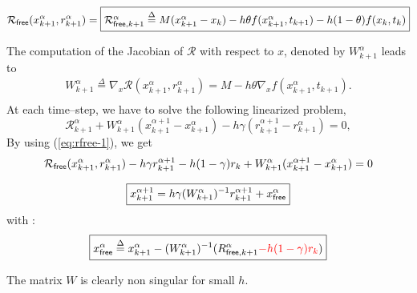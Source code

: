 \[  \mathcal R
_{{\sf free}}(x^{\alpha}_{k+1},r^{\alpha}_{k+1} )=\fbox{$ \mathcal R _{{\sf free}, k+1} ^{\alpha} \stackrel{\Delta}{=}  M(x^{\alpha}_{k+1} - x_{k}) -h\theta f( x^{\alpha}_{k+1} , t_{k+1}) - h(1-\theta)f(x_k,t_k)$}\]
 
The computation of the Jacobian of $\mathcal R$ with respect to $x$, denoted by $   W^{\alpha}_{k+1}$ leads to 
\begin{equation}
   \label{eq:NL9}
   \begin{array}{l}
    W^{\alpha}_{k+1} \stackrel{\Delta}{=} \nabla_{x} \mathcal R (x^{\alpha}_{k+1},r^{\alpha}_{k+1})= M - h  \theta \nabla_{x} f(  x^{\alpha}_{k+1}, t_{k+1} ).\\
 \end{array}
\end{equation}
At each time--step, we have to solve the following linearized problem,
\begin{equation}
   \label{eq:NL10}
    \mathcal R^{\alpha}_{k+1} + W^{\alpha}_{k+1} (x^{\alpha+1}_{k+1} -
    x^{\alpha}_{k+1}) - h \gamma (r^{\alpha+1}_{k+1} - r^{\alpha}_{k+1} )  =0 ,
\end{equation}
By using (\ref{eq:rfree-1}), we get
\begin{equation}
  \label{eq:rfree-2}
  \mathcal R
_{{\sf free}}(x^{\alpha}_{k+1},r^{\alpha}_{k+1} )  - h\gamma r^{\alpha+1}_{k+1} - h(1-\gamma)r_k  + W^{\alpha}_{k+1} (x^{\alpha+1}_{k+1} -
    x^{\alpha}_{k+1})  =0 
\end{equation}

{
  \begin{equation}
    \label{eq:rfree-11}
    \boxed{ x^{\alpha+1}_{k+1} = h\gamma (W^{\alpha}_{k+1})^{-1}r^{\alpha+1}_{k+1} +x^\alpha_{{\sf free}}}
  \end{equation}
}
with :
\begin{equation}
  \label{eq:rfree-12}
  \boxed{x^\alpha_{{\sf free}}\stackrel{\Delta}{=}x^{\alpha}_{k+1}-(W^{\alpha}_{k+1})^{-1}\mathcal (R_{{\sf free},k+1}^{\alpha} \textcolor{red}{- h(1-\gamma) r_k})}
\end{equation}

The matrix $W$ is clearly non singular for small $h$.





